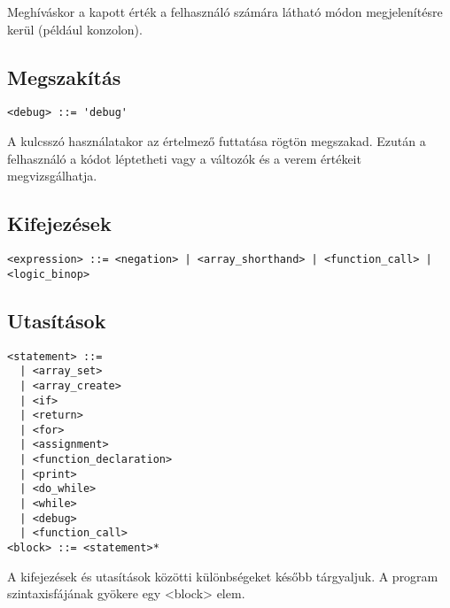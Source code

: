 Meghíváskor a kapott érték a felhasználó számára látható módon megjelenítésre kerül (például konzolon).

\subsection{Megszakítás}

\begin{footnotesize}
\begin{verbatim}
<debug> ::= 'debug'
\end{verbatim}
\end{footnotesize}

A kulcsszó használatakor az értelmező futtatása rögtön megszakad. Ezután a felhasználó a kódot léptetheti vagy a változók és a verem értékeit megvizsgálhatja.

\subsection{Kifejezések}

\begin{footnotesize}
\begin{verbatim}
<expression> ::= <negation> | <array_shorthand> | <function_call> | <logic_binop>
\end{verbatim}
\end{footnotesize}

\subsection{Utasítások}

\begin{footnotesize}
\begin{verbatim}
<statement> ::= 
  | <array_set> 
  | <array_create> 
  | <if> 
  | <return> 
  | <for> 
  | <assignment> 
  | <function_declaration> 
  | <print> 
  | <do_while> 
  | <while> 
  | <debug> 
  | <function_call>
<block> ::= <statement>*
\end{verbatim}
\end{footnotesize}

A kifejezések és utasítások közötti különbségeket később tárgyaljuk. A program szintaxisfájának gyökere egy <block> elem.